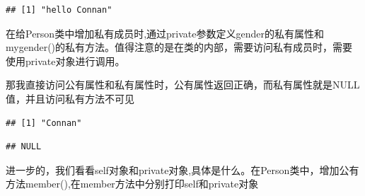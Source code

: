 \documentclass[]{book}
\newenvironment{Shaded}{\begin{snugshade}}{\end{snugshade}}
\newcommand{\CommentTok}[1]{\textcolor[rgb]{0.56,0.35,0.01}{\textit{#1}}}
\newcommand{\OperatorTok}[1]{\textcolor[rgb]{0.81,0.36,0.00}{\textbf{#1}}}
\newcommand{\NormalTok}[1]{#1}
\begin{document}
\begin{verbatim}
## [1] "hello Connan"
\end{verbatim}

在给Person类中增加私有成员时,通过private参数定义gender的私有属性和mygender()的私有方法。值得注意的是在类的内部，需要访问私有成员时，需要使用private对象进行调用。

那我直接访问公有属性和私有属性时，公有属性返回正确，而私有属性就是NULL值，并且访问私有方法不可见

\begin{Shaded}
\end{Shaded}

\begin{verbatim}
## [1] "Connan"
\end{verbatim}

\begin{Shaded}
\end{Shaded}

\begin{verbatim}
## NULL
\end{verbatim}

\begin{Shaded}
\end{Shaded}

进一步的，我们看看self对象和private对象,具体是什么。在Person类中，增加公有方法member(),在member方法中分别打印self和private对象
\end{document}
